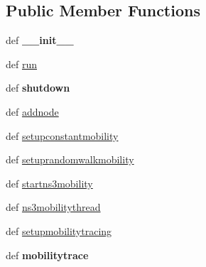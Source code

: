 \subsection*{Public Member Functions}
\begin{DoxyCompactItemize}
\item 
\hypertarget{classcorens3_1_1obj_1_1_ns3_session_a965f262b5a6ee2cce5e320167a8c58c6}{def {\bfseries \+\_\+\+\_\+init\+\_\+\+\_\+}}\label{classcorens3_1_1obj_1_1_ns3_session_a965f262b5a6ee2cce5e320167a8c58c6}

\item 
def \hyperlink{classcorens3_1_1obj_1_1_ns3_session_a39937c4db3b46da5b7ee18586402ab05}{run}
\item 
\hypertarget{classcorens3_1_1obj_1_1_ns3_session_a094d113725ca725916716cca544ce75d}{def {\bfseries shutdown}}\label{classcorens3_1_1obj_1_1_ns3_session_a094d113725ca725916716cca544ce75d}

\item 
def \hyperlink{classcorens3_1_1obj_1_1_ns3_session_ac7b7eae6b10d3271d8023ce2927af012}{addnode}
\item 
def \hyperlink{classcorens3_1_1obj_1_1_ns3_session_a587c87086a82c446fcc5fdd0aa2006a6}{setupconstantmobility}
\item 
def \hyperlink{classcorens3_1_1obj_1_1_ns3_session_a3ac27b94269efce960d336c966e68e0a}{setuprandomwalkmobility}
\item 
def \hyperlink{classcorens3_1_1obj_1_1_ns3_session_ae4e82357ea7e7bcee87bf0912e2275f0}{startns3mobility}
\item 
def \hyperlink{classcorens3_1_1obj_1_1_ns3_session_a2ef55c4fbd91964599e885acfe736756}{ns3mobilitythread}
\item 
def \hyperlink{classcorens3_1_1obj_1_1_ns3_session_adb893b0e08fc66e8f35f3b8d4c87a516}{setupmobilitytracing}
\item 
\hypertarget{classcorens3_1_1obj_1_1_ns3_session_a882ce8f63b60008b7152ce49656ca92e}{def {\bfseries mobilitytrace}}\label{classcorens3_1_1obj_1_1_ns3_session_a882ce8f63b60008b7152ce49656ca92e}

\end{DoxyCompactItemize}
